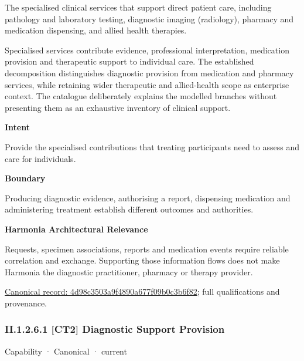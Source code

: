 The specialised clinical services that support direct patient care, including pathology and laboratory testing, diagnostic imaging (radiology), pharmacy and medication dispensing, and allied health therapies.



Specialised services contribute evidence, professional interpretation, medication provision and therapeutic support to individual care. The established decomposition distinguishes diagnostic provision from medication and pharmacy services, while retaining wider therapeutic and allied-health scope as enterprise context. The catalogue deliberately explains the modelled branches without presenting them as an exhaustive inventory of clinical support.



\textbf{Intent}



Provide the specialised contributions that treating participants need to assess and care for individuals.



\textbf{Boundary}



Producing diagnostic evidence, authorising a report, dispensing medication and administering treatment establish different outcomes and authorities.



\textbf{Harmonia Architectural Relevance}



Requests, specimen associations, reports and medication events require reliable correlation and exchange. Supporting those information flows does not make Harmonia the diagnostic practitioner, pharmacy or therapy provider.


{\footnotesize \href{../../../../continuum/strategy/capability/4d98c3503a9f4890a677f09b0c3b6f82.md}{Canonical record: 4d98c3503a9f4890a677f09b0c3b6f82}; full qualifications and provenance.}\par
\subsubsection*{II.1.2.6.1 [CT2] Diagnostic Support Provision}
\label{navigation:II.1.2.6.1}

\label{element:827910cf74ae4061afbda52dde3da106}
{\small Capability · Canonical · current}\par

